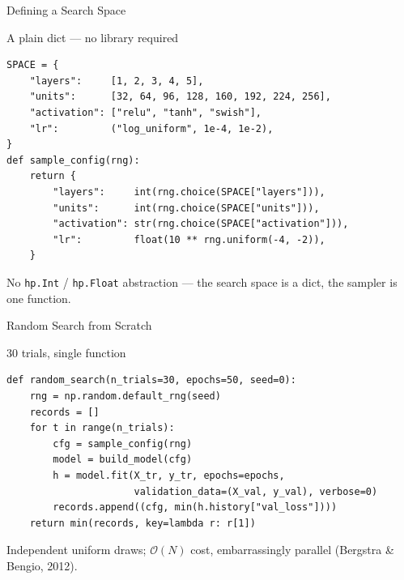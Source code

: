\documentclass[aspectratio=169,11pt]{beamer}
\begin{document}
\begin{frame}[fragile]{Defining a Search Space}
\begin{block}{A plain dict --- no library required}
{\scriptsize
\begin{verbatim}
SPACE = {
    "layers":     [1, 2, 3, 4, 5],
    "units":      [32, 64, 96, 128, 160, 192, 224, 256],
    "activation": ["relu", "tanh", "swish"],
    "lr":         ("log_uniform", 1e-4, 1e-2),
}
def sample_config(rng):
    return {
        "layers":     int(rng.choice(SPACE["layers"])),
        "units":      int(rng.choice(SPACE["units"])),
        "activation": str(rng.choice(SPACE["activation"])),
        "lr":         float(10 ** rng.uniform(-4, -2)),
    }
\end{verbatim}
}
\end{block}
{\scriptsize No \texttt{hp.Int} / \texttt{hp.Float} abstraction --- the search space is a dict, the sampler is one function.}
\end{frame}

\begin{frame}[fragile]{Random Search from Scratch}
\begin{block}{30 trials, single function}
{\scriptsize
\begin{verbatim}
def random_search(n_trials=30, epochs=50, seed=0):
    rng = np.random.default_rng(seed)
    records = []
    for t in range(n_trials):
        cfg = sample_config(rng)
        model = build_model(cfg)
        h = model.fit(X_tr, y_tr, epochs=epochs,
                      validation_data=(X_val, y_val), verbose=0)
        records.append((cfg, min(h.history["val_loss"])))
    return min(records, key=lambda r: r[1])
\end{verbatim}
}
\end{block}
{\scriptsize Independent uniform draws; $\mathcal{O}(N)$ cost, embarrassingly parallel (Bergstra \& Bengio, 2012).}
\end{frame}
\end{document}
